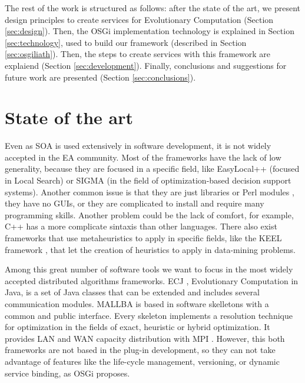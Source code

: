 \documentclass{sig-alternate}
\begin{document}
The rest of the work is structured as follows: after the state of
the art, we present design principles to create services for Evolutionary Computation (Section \ref{sec:design}). Then, the OSGi implementation technology is explained in Section \ref{sec:technology}, used to build our framework (described in Section \ref{sec:osgiliath}). Then, the steps to create services with this framework are explaiend (Section \ref{sec:development}). Finally, conclusions and suggestions for future work are presented (Section \ref{sec:conclusions}).


%
\section{State of the art}
\label{sec:soa}
%
Even as SOA is used extensively in software development, it is not widely accepted in the EA community. Most of the frameworks have the lack of low generality, because they
are focused in a specific field, like EasyLocal++ \cite{EASYLOCAL} (focused in Local Search) or
SIGMA \cite{SIGMA} (in the field of optimization-based decision support systems). Another common issue is that they are just libraries
 or Perl modules \cite{PERL}, they have no GUIs, or they are complicated to
install and require many programming skills. Another problem could be
the lack of comfort, for example, C++ has a more complicate sintaxis
than other languages. There also exist frameworks that use metaheuristics to apply in specific fields, like the KEEL framework \cite{KEEL}, that let the creation of heuristics to apply in data-mining problems.

Among this great number of software tools we want to focus in the most widely accepted distributed algorithms frameworks. ECJ \cite{ECJ}, Evolutionary Computation in Java, is a set of Java classes that can be extended and includes several communication modules. MALLBA \cite{MALLBA} is based in software skelletons with a common and public interface. Every skeleton implements a resolution technique for optimization in the fields of exact, heuristic or hybrid optimization. It provides LAN and WAN capacity distribution with MPI . However, this both frameworks are not based in the plug-in development, so they can not take advantage of features like the life-cycle management, versioning, or dynamic service binding, as OSGi proposes.
\end{document}
